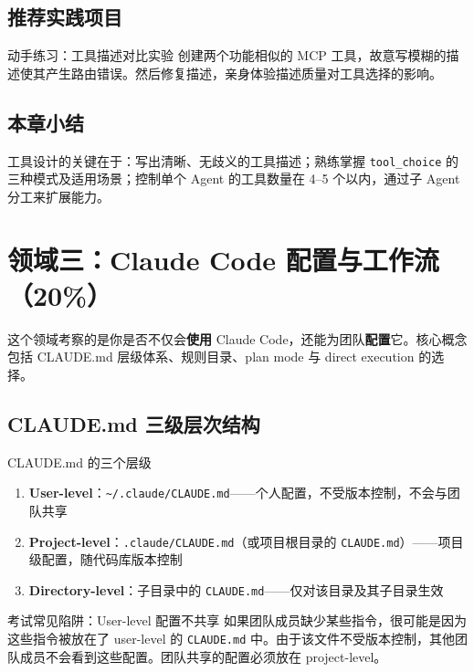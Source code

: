 \documentclass[a4paper]{article}
\begin{document}
\subsection{推荐实践项目}

\begin{knowledgebox}{动手练习：工具描述对比实验}
创建两个功能相似的 MCP 工具，故意写模糊的描述使其产生路由错误。然后修复描述，亲身体验描述质量对工具选择的影响。
\end{knowledgebox}

\subsection{本章小结}

工具设计的关键在于：写出清晰、无歧义的工具描述；熟练掌握 \texttt{tool\_choice} 的三种模式及适用场景；控制单个 Agent 的工具数量在 4--5 个以内，通过子 Agent 分工来扩展能力。

\section{领域三：Claude Code 配置与工作流（20\%）}

这个领域考察的是你是否不仅会\textbf{使用} Claude Code，还能为团队\textbf{配置}它。核心概念包括 CLAUDE.md 层级体系、规则目录、plan mode 与 direct execution 的选择。

\subsection{CLAUDE.md 三级层次结构}

\begin{importantbox}{CLAUDE.md 的三个层级}
\begin{enumerate}[leftmargin=1.5em]
    \item \textbf{User-level}：\texttt{\textasciitilde/.claude/CLAUDE.md}——个人配置，不受版本控制，不会与团队共享
    \item \textbf{Project-level}：\texttt{.claude/CLAUDE.md}（或项目根目录的 \texttt{CLAUDE.md}）——项目级配置，随代码库版本控制
    \item \textbf{Directory-level}：子目录中的 \texttt{CLAUDE.md}——仅对该目录及其子目录生效
\end{enumerate}
\end{importantbox}

\begin{warningbox}{考试常见陷阱：User-level 配置不共享}
如果团队成员缺少某些指令，很可能是因为这些指令被放在了 user-level 的 \texttt{CLAUDE.md} 中。由于该文件不受版本控制，其他团队成员不会看到这些配置。团队共享的配置必须放在 project-level。
\end{warningbox}
\end{document}
